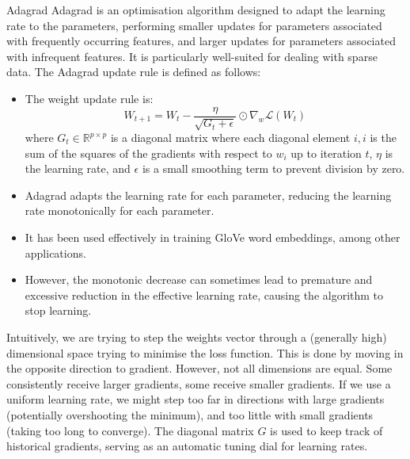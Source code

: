 \begin{definitionbox}{Adagrad}
Adagrad is an optimisation algorithm designed to adapt the learning rate to the parameters, performing smaller updates for parameters associated with frequently occurring features, and larger updates for parameters associated with infrequent features. It is particularly well-suited for dealing with sparse data. The Adagrad update rule is defined as follows:
\begin{itemize}
    \item The weight update rule is:
    \[ W_{t+1} = W_t - \frac{\eta}{\sqrt{G_t + \epsilon}} \odot \nabla_w \mathcal{L}(W_t) \]
    where \( G_t \in \mathbb{R}^{p \times p} \) is a diagonal matrix where each diagonal element \( i, i \) is the sum of the squares of the gradients with respect to \( w_i \) up to iteration \( t \), \( \eta \) is the learning rate, and \( \epsilon \) is a small smoothing term to prevent division by zero.
    \item Adagrad adapts the learning rate for each parameter, reducing the learning rate monotonically for each parameter.
    \item It has been used effectively in training GloVe word embeddings, among other applications.
    \item However, the monotonic decrease can sometimes lead to premature and excessive reduction in the effective learning rate, causing the algorithm to stop learning.
\end{itemize}

Intuitively, we are trying to step the weights vector through a (generally high) dimensional space trying to minimise the loss function. This is done by moving in the opposite direction to gradient. However, not all dimensions are equal. Some consistently receive larger gradients, some receive smaller gradients. If we use a uniform learning rate, we might step too far in directions with large gradients (potentially overshooting the minimum), and too little with small gradients (taking too long to converge). The diagonal matrix \(G\) is used to keep track of historical gradients, serving as an automatic tuning dial for learning rates.
\end{definitionbox}

